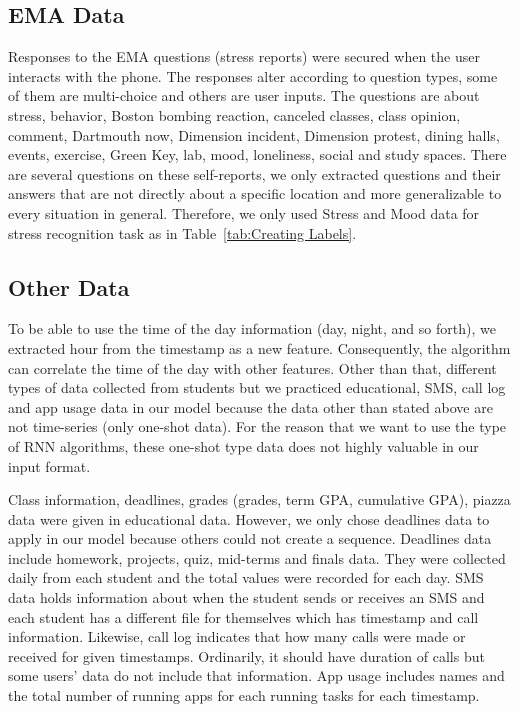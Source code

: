 \documentclass[12pt,oneandhalf,chaparabic,lfm,phd,eng,oneside,pntc]{gsufbe}
\begin{document}
\subsection{EMA Data}
\label{subsec:EMA Data}
Responses to the EMA questions (stress reports) were secured when the user interacts with the phone. The responses alter according to question types, some of them are multi-choice and others are user inputs. The questions are about stress, behavior, Boston bombing reaction, canceled classes, class opinion, comment, Dartmouth now, Dimension incident, Dimension protest, dining halls, events, exercise, Green Key, lab, mood, loneliness, social and study spaces. There are several questions on these self-reports, we only extracted questions and their answers that are not directly about a specific location and more generalizable to every situation in general. Therefore, we only used Stress and Mood data for stress recognition task as in Table~\ref{tab:Creating Labels}. 


\subsection{Other Data}
\label{subsec:Other Data}
To be able to use the time of the day information (day, night, and so forth), we extracted hour from the timestamp as a new feature. Consequently, the algorithm can correlate the time of the day with other features. Other than that, different types of data collected from students but we practiced educational, SMS, call log and app usage data in our model because the data other than stated above are not time-series (only one-shot data). For the reason that we want to use the type of RNN algorithms, these one-shot type data does not highly valuable in our input format.

Class information, deadlines, grades (grades, term GPA, cumulative GPA), piazza data were given in educational data. However, we only chose deadlines data to apply in our model because others could not create a sequence. Deadlines data include homework, projects, quiz, mid-terms and finals data. They were collected daily from each student and the total values were recorded for each day. SMS data holds information about when the student sends or receives an SMS and each student has a different file for themselves which has timestamp and call information. Likewise, call log indicates that how many calls were made or received for given timestamps. Ordinarily, it should have duration of calls but some users' data do not include that information. App usage includes names and the total number of running apps for each running tasks for each timestamp.
\end{document}
